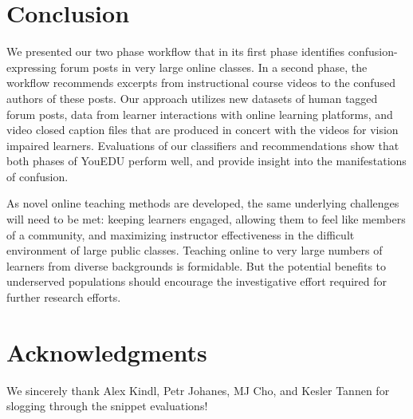\documentclass{edm_template}
\begin{document}
\section{Conclusion}
\label{sec:conclusion}
We presented our two phase workflow that in its first phase identifies
confusion-expressing forum posts in very large online classes. In a
second phase, the workflow recommends excerpts from instructional course
videos to the confused authors of these posts. Our approach utilizes new datasets
of human tagged forum posts, data from learner interactions with online learning
platforms, and video closed caption files that are produced in concert with the
videos for vision impaired learners. Evaluations of our classifiers and recommendations show that both phases of YouEDU perform well, and provide insight into the
manifestations of confusion.

As novel online teaching methods are developed, the same underlying
challenges will need to be met: keeping learners engaged, allowing
them to feel like members of a community, and maximizing instructor
effectiveness in the difficult environment of large public classes.
Teaching online to very large numbers of learners from diverse backgrounds is formidable.
But the potential benefits to underserved populations should encourage
the investigative effort required for further research efforts.

\section{Acknowledgments}
We sincerely thank Alex Kindl, Petr Johanes, MJ Cho, and Kesler Tannen
for slogging through the snippet evaluations!


\end{document}

